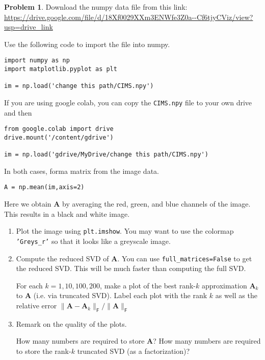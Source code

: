 \documentclass[12pt]{article}
\theoremstyle{definition}
\newtheorem{problem}{Problem}
\renewcommand{\vec}{\mathbf}
\newcommand{\F}{\mathsf{F}}
\begin{document}
\vspace{4em}

\begin{problem}

    Download the numpy data file from this link: \url{https://drive.google.com/file/d/18Xf0029XXm3ENWfe3Z0a--Cf6tjyCViz/view?usp=drive_link}

Use the following code to import the file into numpy.

\begin{lstlisting}
import numpy as np
import matplotlib.pyplot as plt

im = np.load('change this path/CIMS.npy')
\end{lstlisting}

    If you are using google colab, you can copy the \lstinline{CIMS.npy} file to your own drive and then 
\begin{lstlisting}
from google.colab import drive
drive.mount('/content/gdrive')

im = np.load('gdrive/MyDrive/change this path/CIMS.npy')
\end{lstlisting}

In both cases, forma matrix from the image data.
\begin{lstlisting}
A = np.mean(im,axis=2)
\end{lstlisting}
Here we obtain $\vec{A}$ by averaging the red, green, and blue channels of the image.
This results in a black and white image.

    \begin{enumerate}
        \item Plot the image using \lstinline{plt.imshow}.
            You may want to use the colormap \texttt{'Greys\_r'} so that it looks like a greyscale image.
        \item
            Compute the reduced SVD of $\vec{A}$. 
            You can use \lstinline{full_matrices=False} to get the reduced SVD.
            This will be much faster than computing the full SVD.

            For each $k=1,10,100,200$, make a plot of the best rank-$k$ approximation $\vec{A}_k$ to $\vec{A}$ (i.e. via truncated SVD).
            Label each plot with the rank $k$ as well as the relative error $\| \vec{A} - \vec{A}_k \|_\F / \| \vec{A} \|_\F$
        \item 
            Remark on the quality of the plots. 
            
            How many numbers are required to store $\vec{A}$?
            How many numbers are required to store the rank-$k$ truncated SVD (as a factorization)?
    \end{enumerate}

\end{problem}
\end{document}
